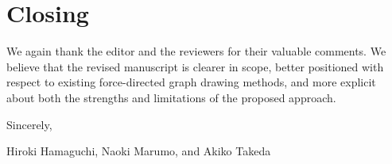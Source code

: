 \documentclass[11pt]{article}
\begin{document}
\bigskip

\section*{Closing}

We again thank the editor and the reviewers for their valuable comments.
We believe that the revised manuscript is clearer in scope, better positioned with respect to existing force-directed graph drawing methods, and more explicit about both the strengths and limitations of the proposed approach.

\medskip

Sincerely,

\medskip

Hiroki Hamaguchi, Naoki Marumo, and Akiko Takeda
\end{document}
